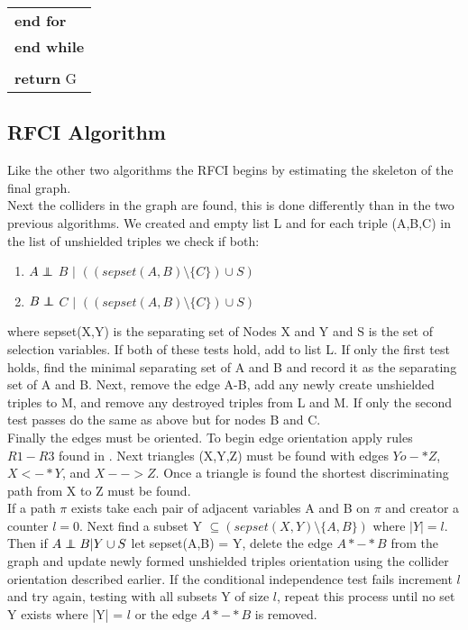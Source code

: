 \documentclass{article}
\newcommand\independent{\protect\mathpalette{\protect\independenT}{\perp}}
\def\independenT#1#2{\mathrel{\rlap{$#1#2$}\mkern2mu{#1#2}}}
\begin{document}
\begin{table}[h!]
\begin{tabular}{|l l|}
		\multicolumn{2}{|l|}{\quad\textbf{end for}}\\
		\multicolumn{2}{|l|}{\textbf{end while}}\\
		&\\
		\multicolumn{2}{|l|}{\textbf{return} G}\\
		\hline 
	\end{tabular}
\end{table}

\subsection{RFCI Algorithm}
Like the other two algorithms the RFCI begins by estimating the skeleton of the final graph.
\\

Next the colliders in the graph are found, this is done differently than in the two previous algorithms. We created and empty list L and for each triple (A,B,C) in the list of unshielded triples we check if both:
\\

\begin{enumerate}[i]
	\item $A \independent$ $B$ $|$ $((sepset(A,B) \setminus \{C\})\cup S)$
	\item $B \independent$ $C$ $|$ $((sepset(A,B) \setminus \{C\})\cup S)$\end{enumerate}
where sepset(X,Y) is the separating set of Nodes X and Y and S is the set of selection variables. If both of these tests hold, add to list L. If only the first test holds, find the minimal separating set of A and B and record it as the separating set of A and B. Next, remove the edge A-B, add any newly create unshielded triples to M, and remove any destroyed triples from L and M. If only the second test passes do the same as above but for nodes B and C.
\\

Finally the edges must be oriented. To begin edge orientation apply rules $R1-R3$ found in \cite{ZHANG20081873}. Next triangles (X,Y,Z) must be found with edges $Yo-*Z$, $X<-*Y$, and $X-->Z$. Once a triangle is found the shortest discriminating path from X to Z must be found.
\\

If a path $\pi$ exists take each pair of adjacent variables A and B on $\pi$ and creator a counter $l = 0$. Next find  a subset Y  $\subseteq (sepset(X,Y) \setminus \{A,B\})$ where $|Y| = l$. Then if $A \independent B | Y \cup S$ let sepset(A,B) = Y, delete the edge $A*-*B$ from the graph and update newly formed unshielded triples orientation using the collider orientation described earlier. If the conditional independence test fails increment $l$ and try again, testing with all subsets Y of size $l$, repeat this process until no set Y exists where |Y| = $l$ or the edge $A*-*B$ is removed. 
\\
\end{document}
